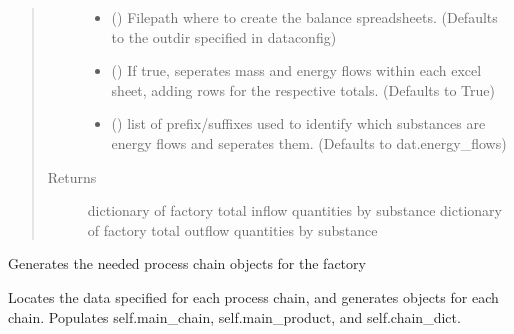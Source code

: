 \documentclass[a4paper,10pt,english]{sphinxmanual}
\begin{document}
\begin{fulllineitems}
\begin{fulllineitems}
\begin{quote}
\begin{description}
\begin{itemize}
\item {} 
 () \textendash{} Filepath where to create the balance spreadsheets.
(Defaults to the outdir specified in dataconfig)

\item {} 
 () \textendash{} If true, seperates mass and energy flows within
each excel sheet, adding rows for the respective totals.
(Defaults to True)

\item {} 
 () \textendash{} list of prefix/suffixes used to identify which
substances are energy flows and seperates them.
(Defaults to dat.energy\_flows)

\end{itemize}

\item[{Returns}] \leavevmode
dictionary of factory total inflow quantities by substance
dictionary of factory total outflow quantities by substance

\end{description}\end{quote}

\end{fulllineitems}


\begin{fulllineitems}
\label{\detokenize{factory:factory.Factory.build}}
Generates the needed process chain objects for the factory

Locates the data specified for each process chain, and generates
objects for each chain. Populates self.main\_chain, self.main\_product,
and self.chain\_dict.

\end{fulllineitems}



\end{fulllineitems}
\end{document}
